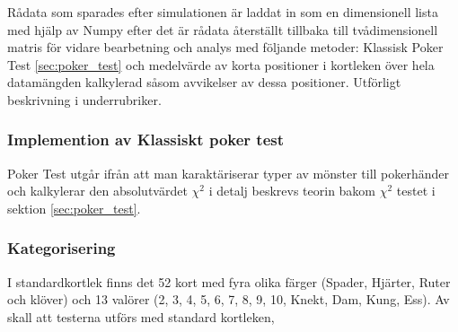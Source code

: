 \documentclass[swedish,a4paper]{article}
\begin{document}
Rådata som sparades efter simulationen är laddat in som en dimensionell
lista med hjälp av Numpy  efter det är rådata återställt tillbaka till
tvådimensionell matris för vidare bearbetning och analys med följande
metoder: Klassisk Poker Test \ref{sec:poker_test} och medelvärde av
korta positioner i kortleken över hela datamängden kalkylerad såsom
avvikelser av dessa positioner. Utförligt beskrivning i underrubriker. 

\subsubsection{Implemention av Klassiskt poker test}
Poker Test utgår ifrån att man karaktäriserar typer av mönster till 
pokerhänder och kalkylerar  den absolutvärdet $\chi^2$ i detalj beskrevs
teorin bakom $\chi^2$ testet i sektion
\ref{sec:poker_test}. 

\subsubsection*{Kategorisering}
I standardkortlek finns det 52 kort med fyra olika 
färger (Spader, Hjärter, Ruter och klöver) och 13 valörer 
(2, 3, 4, 5, 6, 7, 8, 9, 10, Knekt, Dam, Kung, Ess).
Av skall att testerna utförs med standard kortleken,
\end{document}
